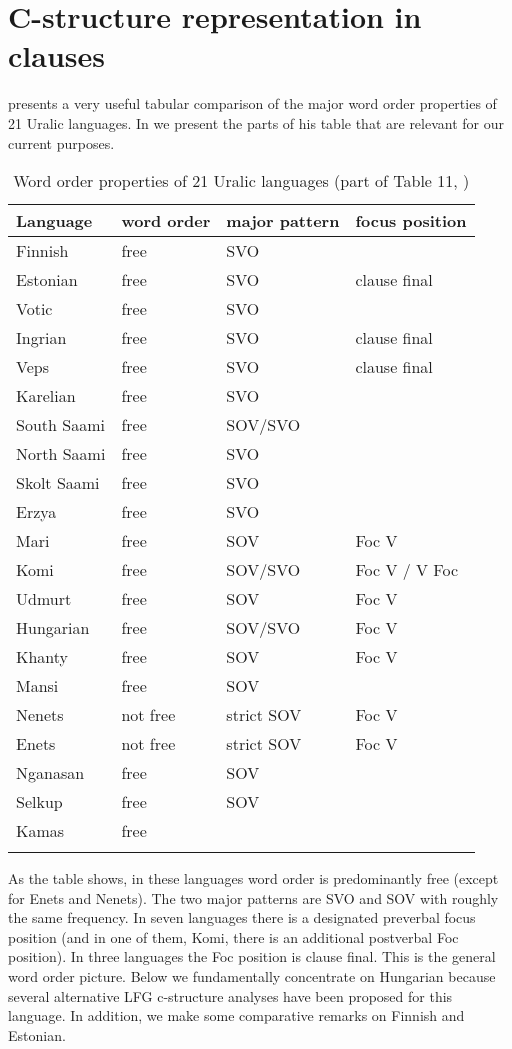 \documentclass[output=paper,hidelinks]{langscibook}
\begin{document}
\section{C-structure representation in clauses}
\label{sec:FinnoUgric:2}

\citet{Groot2017} presents a very useful tabular comparison of the major word order properties of 21 Uralic languages. In  we present the parts of his table that are relevant for our current purposes.


\begin{table}
\begin{tabularx}{.8\textwidth}{Xlll}
\lsptoprule
{Language} & {word order} & {major pattern} & {focus position}\\\midrule
Finnish & free & SVO & \\
Estonian & free & SVO & clause final\\
Votic & free & SVO & \\
Ingrian & free & SVO & clause final\\
Veps & free & SVO & clause final\\
Karelian & free & SVO & \\
South Saami & free & SOV/SVO & \\
North Saami & free & SVO & \\
Skolt Saami & free & SVO & \\
Erzya & free & SVO & \\
Mari & free & SOV & Foc V\\
Komi & free & SOV/SVO & Foc V / V Foc\\
Udmurt & free & SOV & Foc V\\
Hungarian & free & SOV/SVO & Foc V\\
Khanty & free & SOV & Foc V\\
Mansi & free & SOV & \\
Nenets & not free & strict SOV & Foc V\\
Enets & not free & strict SOV & Foc V\\
Nganasan & free & SOV & \\
Selkup & free & SOV & \\
Kamas & free &  & \\
\lspbottomrule
\end{tabularx}
\caption{Word order properties of 21 Uralic languages (part of Table 11, \citealt[548]{Groot2017})}
\label{tab:FinnoUgric:1}
\end{table}

As the table shows, in these languages word order is predominantly free (except for Enets and Nenets). The two major patterns are SVO and SOV with roughly the same frequency. In seven languages there is a designated preverbal focus position (and in one of them, Komi, there is an additional postverbal Foc position). In three languages the Foc position is clause final. This is the general word order picture. Below we fundamentally concentrate on Hungarian because several alternative LFG c-structure analyses have been proposed for this language. In addition, we make some comparative remarks on Finnish and Estonian. 
\end{document}
